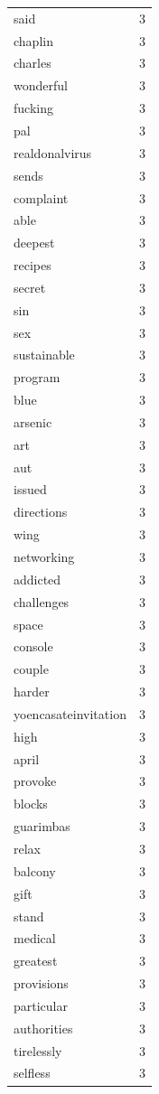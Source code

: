 \begin{tabular}{lr}
said & 3 \\
chaplin & 3 \\
charles & 3 \\
wonderful & 3 \\
fucking & 3 \\
pal & 3 \\
realdonalvirus & 3 \\
sends & 3 \\
complaint & 3 \\
able & 3 \\
deepest & 3 \\
recipes & 3 \\
secret & 3 \\
sin & 3 \\
sex & 3 \\
sustainable & 3 \\
program & 3 \\
blue & 3 \\
arsenic & 3 \\
art & 3 \\
aut & 3 \\
issued & 3 \\
directions & 3 \\
wing & 3 \\
networking & 3 \\
addicted & 3 \\
challenges & 3 \\
space & 3 \\
console & 3 \\
couple & 3 \\
harder & 3 \\
yoencasateinvitation & 3 \\
high & 3 \\
april & 3 \\
provoke & 3 \\
blocks & 3 \\
guarimbas & 3 \\
relax & 3 \\
balcony & 3 \\
gift & 3 \\
stand & 3 \\
medical & 3 \\
greatest & 3 \\
provisions & 3 \\
particular & 3 \\
authorities & 3 \\
tirelessly & 3 \\
selfless & 3 \\

\end{tabular}
